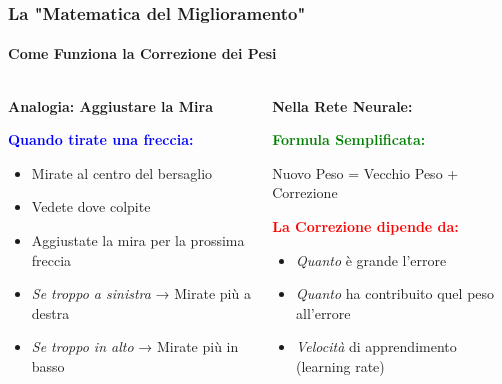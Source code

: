 \documentclass[aspectratio=169]{beamer}
\begin{document}
%
%
\begin{frame}
\frametitle{La "Matematica del Miglioramento"}
\framesubtitle{Come Funziona la Correzione dei Pesi}

\begin{columns}
\begin{column}{0.5\textwidth}
\textbf{Analogia: Aggiustare la Mira}

\vspace{0.3cm}
\textcolor{blue}{\textbf{Quando tirate una freccia:}}
\begin{itemize}
    \item Mirate al centro del bersaglio
    \item Vedete dove colpite
    \item Aggiustate la mira per la prossima freccia
    \item \textit{Se troppo a sinistra} → Mirate più a destra
    \item \textit{Se troppo in alto} → Mirate più in basso
\end{itemize}

\end{column}

\begin{column}{0.5\textwidth}
\textbf{Nella Rete Neurale:}

\vspace{0.3cm}
\textcolor{green}{\textbf{Formula Semplificata:}}
\begin{center}
Nuovo Peso = Vecchio Peso + Correzione
\end{center}

\vspace{0.3cm}
\textcolor{red}{\textbf{La Correzione dipende da:}}
\begin{itemize}
    \item \textit{Quanto} è grande l'errore
    \item \textit{Quanto} ha contribuito quel peso all'errore
    \item \textit{Velocità} di apprendimento (learning rate)
\end{itemize}

\end{column}
\end{columns}

\end{frame}
%
%
\end{document}
